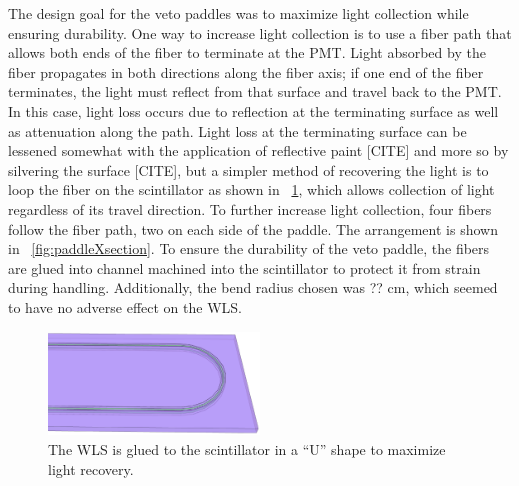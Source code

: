 The design goal for the veto paddles was to maximize light collection while ensuring durability.  One way to increase light collection is to use a fiber path that allows both ends of the fiber to terminate at the PMT.  Light absorbed by the fiber propagates in both directions along the fiber axis; if one end of the fiber terminates, the light must reflect from that surface and travel back to the PMT.  In this case, light loss occurs due to reflection at the terminating surface as well as attenuation along the path.  Light loss at the terminating surface can be lessened somewhat with the application of reflective paint [CITE] and more so by silvering the surface [CITE], but a simpler method of recovering the light is to loop the fiber on the scintillator as shown in {\fig}~\ref{fig:paddle}, which allows collection of light regardless of its travel direction.  To further increase light collection, four fibers follow the fiber path, two on each side of the paddle.  The arrangement is shown in {\fig}~\ref{fig:paddleXsection}.  To ensure the durability of the veto paddle, the fibers are glued into channel machined into the scintillator to protect it from strain during handling.  Additionally, the bend radius chosen was ?? cm, which seemed to have no adverse effect on the WLS.
\begin{figure}[htp]
\centering
\includegraphics[width=0.5\textwidth]{figures/veto_end.eps}
\caption{The WLS is glued to the scintillator in a ``U'' shape to maximize light recovery.}
\label{fig:paddle}
\end{figure}

